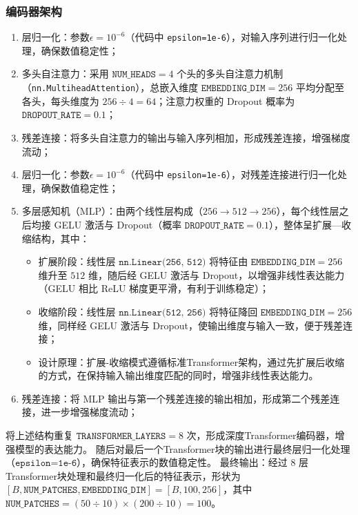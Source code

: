 \subsubsection{编码器架构}
\begin{enumerate}[label={（\arabic*）}, leftmargin=2em, labelsep=0.5em, itemsep=0pt]
    \item 层归一化：参数$\epsilon=10^{-6}$（代码中 \texttt{epsilon=1e-6}），对输入序列进行归一化处理，确保数值稳定性；
    \item 多头自注意力：采用 $\texttt{NUM\_HEADS}=4$ 个头的多头自注意力机制（\texttt{nn.MultiheadAttention}），总嵌入维度 $\texttt{EMBEDDING\_DIM}=256$ 平均分配至各头，每头维度为 $256 \div 4 = 64$；注意力权重的 Dropout 概率为 $\texttt{DROPOUT\_RATE}=0.1$；
    \item 残差连接：将多头自注意力的输出与输入序列相加，形成残差连接，增强梯度流动；
    \item 层归一化：参数$\epsilon=10^{-6}$（代码中 \texttt{epsilon=1e-6}），对残差连接进行归一化处理，确保数值稳定性；
    \item 多层感知机（MLP）：由两个线性层构成（$256 \to 512 \to 256$），每个线性层之后均接 GELU 激活与 Dropout（概率 $\texttt{DROPOUT\_RATE}=0.1$），整体呈扩展—收缩结构，其中：
    \begin{itemize}
        \item 扩展阶段：线性层 $\texttt{nn.Linear(256, 512)}$ 将特征由 $\texttt{EMBEDDING\_DIM}=256$ 维升至 $512$ 维，随后经 GELU 激活与 Dropout，以增强非线性表达能力（GELU 相比 ReLU 梯度更平滑，有利于训练稳定）；
        \item 收缩阶段：线性层 $\texttt{nn.Linear(512, 256)}$ 将特征降回 $\texttt{EMBEDDING\_DIM}=256$ 维，同样经 GELU 激活与 Dropout，使输出维度与输入一致，便于残差连接；
        \item 设计原理：扩展-收缩模式遵循标准Transformer架构，通过先扩展后收缩的方式，在保持输入输出维度匹配的同时，增强非线性表达能力。
    \end{itemize}
    \item 残差连接：将 MLP 输出与第一个残差连接的输出相加，形成第二个残差连接，进一步增强梯度流动；
\end{enumerate}
将上述结构重复 $\texttt{TRANSFORMER\_LAYERS}=8$ 次，形成深度Transformer编码器，增强模型的表达能力。
随后对最后一个Transformer块的输出进行最终层归一化处理（$\texttt{epsilon=1e-6}$），确保特征表示的数值稳定性。
最终输出：经过 $8$ 层Transformer块处理和最终归一化后的特征表示，形状为 $[B, \texttt{NUM\_PATCHES}, \texttt{EMBEDDING\_DIM}]=[B, 100, 256]$，其中 $\texttt{NUM\_PATCHES}=(50 \div 10) \times (200 \div 10) = 100$。

